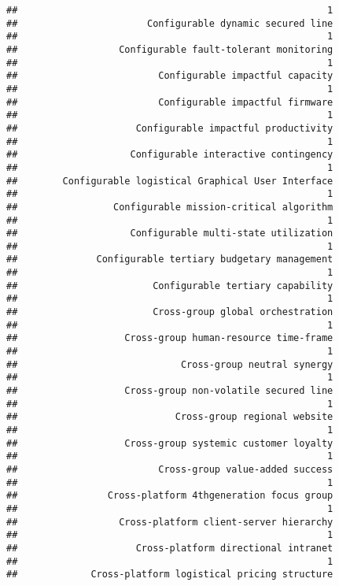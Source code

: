 \documentclass[
]{article}
\begin{document}
\begin{verbatim}
##                                                       1 
##                       Configurable dynamic secured line 
##                                                       1 
##                  Configurable fault-tolerant monitoring 
##                                                       1 
##                         Configurable impactful capacity 
##                                                       1 
##                         Configurable impactful firmware 
##                                                       1 
##                     Configurable impactful productivity 
##                                                       1 
##                    Configurable interactive contingency 
##                                                       1 
##        Configurable logistical Graphical User Interface 
##                                                       1 
##                 Configurable mission-critical algorithm 
##                                                       1 
##                    Configurable multi-state utilization 
##                                                       1 
##              Configurable tertiary budgetary management 
##                                                       1 
##                        Configurable tertiary capability 
##                                                       1 
##                        Cross-group global orchestration 
##                                                       1 
##                   Cross-group human-resource time-frame 
##                                                       1 
##                             Cross-group neutral synergy 
##                                                       1 
##                   Cross-group non-volatile secured line 
##                                                       1 
##                            Cross-group regional website 
##                                                       1 
##                   Cross-group systemic customer loyalty 
##                                                       1 
##                         Cross-group value-added success 
##                                                       1 
##                Cross-platform 4thgeneration focus group 
##                                                       1 
##                  Cross-platform client-server hierarchy 
##                                                       1 
##                     Cross-platform directional intranet 
##                                                       1 
##             Cross-platform logistical pricing structure 

\end{verbatim}
\end{document}
